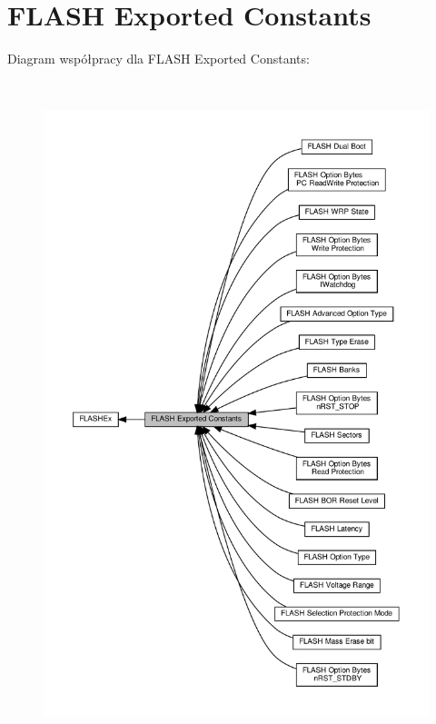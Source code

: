 \hypertarget{group___f_l_a_s_h_ex___exported___constants}{}\section{F\+L\+A\+SH Exported Constants}
\label{group___f_l_a_s_h_ex___exported___constants}
Diagram współpracy dla F\+L\+A\+SH Exported Constants\+:\nopagebreak
\begin{figure}[H]
\begin{center}
\leavevmode
\includegraphics[height=550pt]{group___f_l_a_s_h_ex___exported___constants}
\end{center}
\end{figure}
